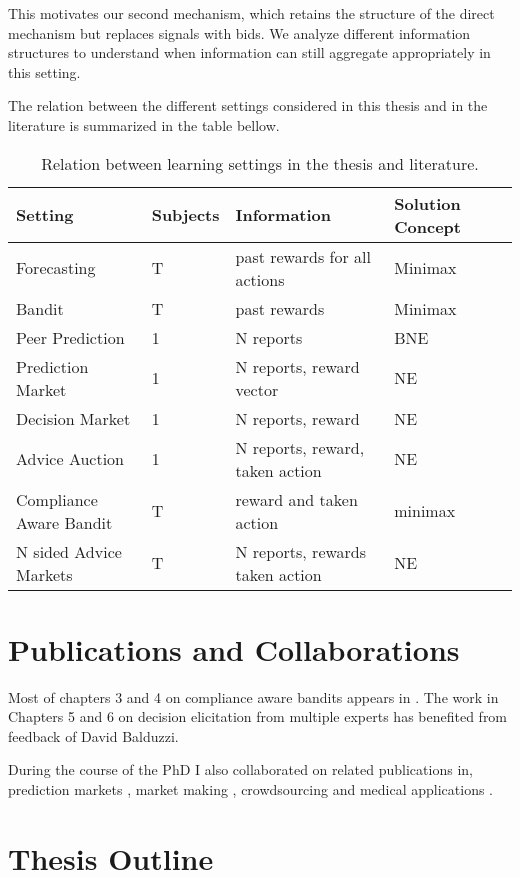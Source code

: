 This motivates our second mechanism, which retains the structure of the direct mechanism but replaces signals with bids. We analyze different information structures to understand when information can still aggregate appropriately in this setting.

The relation between the different settings considered in this thesis and in the literature is summarized in the table bellow.

\begin{table}
	\begin{tabular}{lllll}
		\toprule
		Setting & Subjects & Information & Solution Concept\\
		\midrule
		Forecasting & T  & past rewards for all actions & Minimax  \\
		Bandit & T  & past rewards &  Minimax  \\
		Peer Prediction & 1 & N reports & BNE \\
		Prediction Market & 1 & N reports, reward vector &  NE\\
		Decision Market & 1 & N reports, reward  & NE  \\
		Advice Auction  & 1 & N reports, reward, taken action & NE  \\
		Compliance Aware Bandit & T  & reward and taken action & minimax \\
		N sided Advice Markets  & T  &  N  reports, rewards taken action & NE  \\
		\bottomrule
	\end{tabular}
	\caption{Relation between learning settings in the thesis and literature.}
\end{table}


\section{Publications and Collaborations}

Most of chapters 3 and 4 on compliance aware bandits appears in \citep{della2016compliance}. The work in Chapters 5 and 6 on decision elicitation from multiple experts has benefited from feedback of David Balduzzi.

During the course of the PhD I also collaborated on related publications in, prediction markets \citep{frongillo2012interpreting}, market making \citep{kinathil2014closed,kinathil2016symbolic}, crowdsourcing \citep{della2012crowd} and medical applications \citep{della2016out}.


\section{Thesis Outline}
\label{sec:outline}


